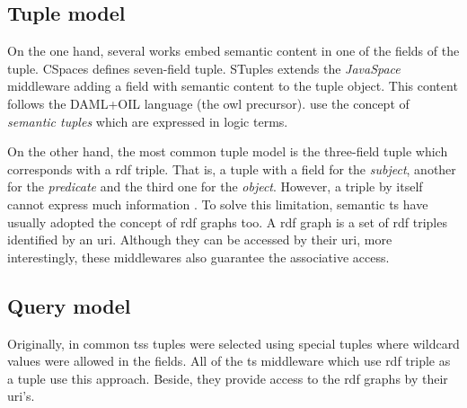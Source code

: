 %


\subsection{Tuple model}

On the one hand, several works embed semantic content in one of the fields of the tuple.
CSpaces \citep{martinrecuerda_towards_2005} defines seven-field tuple.
STuples\citep{khushraj_stuples:_2004} extends the \emph{JavaSpace} \citep{freeman_javaspaces_1999} middleware adding a field with semantic content to the tuple object.
This content follows the DAML+OIL language (the \ac{owl} precursor).
\citet{nardini_semantic_2013} use the concept of \emph{semantic tuples} which are expressed in logic terms.


On the other hand, the most common tuple model is the three-field tuple which corresponds with a \ac{rdf} triple.
That is, a tuple with a field for the \emph{subject}, another for the \emph{predicate} and the third one for the \emph{object}.
However, a triple by itself cannot express much information \citep{krummenacher2006specification}.
To solve this limitation, semantic \ac{ts} have usually adopted the concept of \ac{rdf} graphs too.
A \ac{rdf} graph is a set of \ac{rdf} triples identified by an \ac{uri}. %
Although they can be accessed by their \ac{uri}, more interestingly, these middlewares also guarantee the associative access. %


\subsection{Query model}

Originally, in common \ac{ts}s tuples were selected using special tuples where wildcard values were allowed in the fields.
All of the \ac{ts} middleware which use \ac{rdf} triple as a tuple use this approach.
Beside, they provide access to the \ac{rdf} graphs by their \ac{uri}'s.


